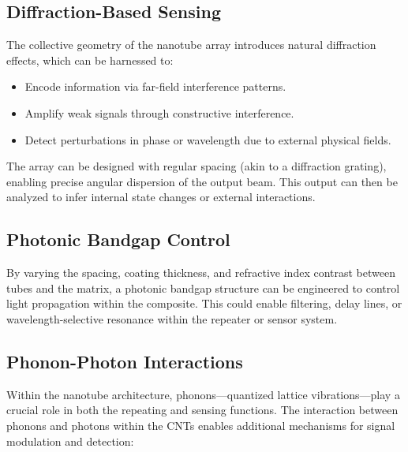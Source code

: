 \documentclass[11pt]{article}
\begin{document}
	\subsection{Diffraction-Based Sensing}
	The collective geometry of the nanotube array introduces natural diffraction effects, which can be harnessed to:
	\begin{itemize}
		\item Encode information via far-field interference patterns.
		\item Amplify weak signals through constructive interference.
		\item Detect perturbations in phase or wavelength due to external physical fields.
	\end{itemize}
	The array can be designed with regular spacing (akin to a diffraction grating), enabling precise angular dispersion of the output beam. This output can then be analyzed to infer internal state changes or external interactions.
	
	\subsection{Photonic Bandgap Control}
	By varying the spacing, coating thickness, and refractive index contrast between tubes and the matrix, a photonic bandgap structure can be engineered to control light propagation within the composite. This could enable filtering, delay lines, or wavelength-selective resonance within the repeater or sensor system.
	
	\subsection{Phonon-Photon Interactions}
	Within the nanotube architecture, phonons—quantized lattice vibrations—play a crucial role in both the repeating and sensing functions. The interaction between phonons and photons within the CNTs enables additional mechanisms for signal modulation and detection:
	
\end{document}
